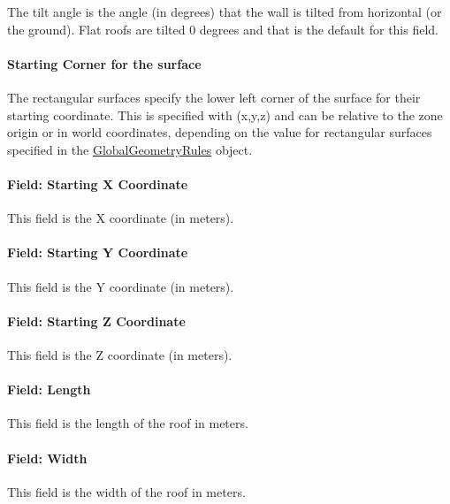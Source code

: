 The tilt angle is the angle (in degrees) that the wall is tilted from horizontal (or the ground). Flat roofs are tilted 0 degrees and that is the default for this field.

\paragraph{Starting Corner for the surface}\label{starting-corner-for-the-surface-4}

The rectangular surfaces specify the lower left corner of the surface for their starting coordinate. This is specified with (x,y,z) and can be relative to the zone origin or in world coordinates, depending on the value for rectangular surfaces specified in the \hyperref[globalgeometryrules]{GlobalGeometryRules} object.

\paragraph{Field: Starting X Coordinate}\label{field-starting-x-coordinate-4}

This field is the X coordinate (in meters).

\paragraph{Field: Starting Y Coordinate}\label{field-starting-y-coordinate-4}

This field is the Y coordinate (in meters).

\paragraph{Field: Starting Z Coordinate}\label{field-starting-z-coordinate-4}

This field is the Z coordinate (in meters).

\paragraph{Field: Length}\label{field-length-4}

This field is the length of the roof in meters.

\paragraph{Field: Width}\label{field-width}

This field is the width of the roof in meters.

